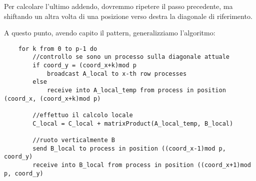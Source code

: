 Per calcolare l'ultimo addendo, dovremmo ripetere il passo precedente, ma shiftando un altra volta di una posizione verso destra la diagonale di riferimento.

A questo punto, avendo capito il pattern, generalizziamo l'algoritmo:
\begin{lstlisting}
    for k from 0 to p-1 do
        //controllo se sono un processo sulla diagonale attuale
        if coord_y = (coord_x+k)mod p
            broadcast A_local to x-th row processes
        else
            receive into A_local_temp from process in position (coord_x, (coord_x+k)mod p)

        //effettuo il calcolo locale
        C_local = C_local + matrixProduct(A_local_temp, B_local)

        //ruoto verticalmente B
        send B_local to process in position ((coord_x-1)mod p, coord_y)
        receive into B_local from process in position ((coord_x+1)mod p, coord_y)
\end{lstlisting}